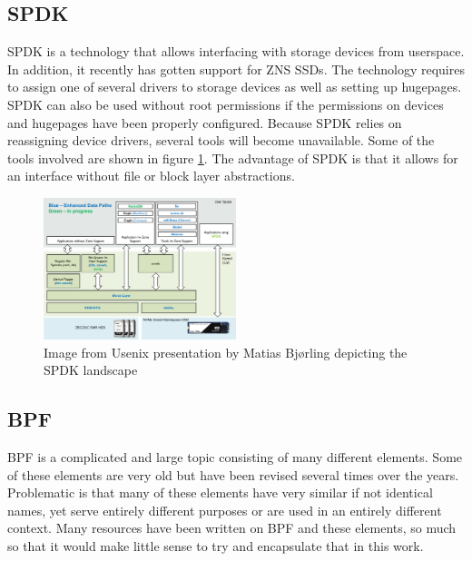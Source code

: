 \documentclass[conference]{IEEEtran}
\begin{document}
\subsection{SPDK}

SPDK is a technology that allows interfacing with storage devices from userspace.
In addition, it recently has gotten support for ZNS SSDs. The technology
requires to assign one of several drivers to storage devices as well as setting
up hugepages. SPDK can also be used without root permissions if the
permissions on devices and hugepages have been properly configured. Because
SPDK relies on reassigning device drivers, several tools will become
unavailable. Some of the tools involved are shown in figure
\ref{fig:spdk-landscape}. The advantage of SPDK is that it allows for an
interface without file or block layer abstractions.

\begin{center}
	\begin{figure}[H]
		\includegraphics[width=0.5\textwidth]{resources/images/spdk-zns-ssd-landscape.png}
		\captionsetup{justification=centering}
		\caption{Image from Usenix presentation by Matias Bj{\o}rling
			depicting the SPDK landscape\cite{246542}}
		\label{fig:spdk-landscape}
	\end{figure}
\end{center}

\subsection{BPF}

BPF is a complicated and large topic consisting of many different elements. Some
of these elements are very old but have been revised several times over the
years. Problematic is that many of these elements have very similar if not
identical names, yet serve entirely different purposes or are used in an
entirely different context. Many resources have been written on BPF and these
elements, so much so that it would make little sense to try and encapsulate that
in this work.
\end{document}
